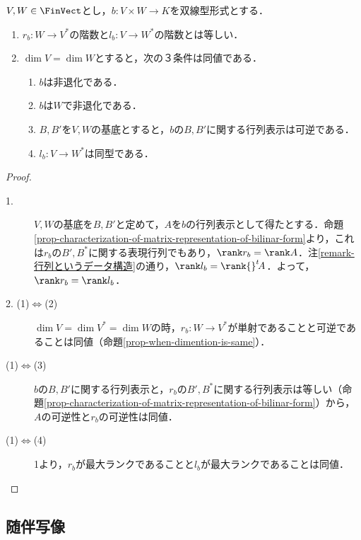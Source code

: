 \documentclass[uplatex, dvipdfmx]{jsreport}
\begin{document}
\begin{proposition}[定義の左右対称性]
    $V,W\in\FinVect$とし，$b:V\times W\to K$を双線型形式とする．
    \begin{enumerate}
        \item $r_b:W\to V^*$の階数と$l_b:V\to W^*$の階数とは等しい．
        \item $\dim V=\dim W$とすると，次の３条件は同値である．
        \begin{enumerate}[(1)]
            \item $b$は非退化である．
            \item $b$は$W$で非退化である．
            \item $B,B'$を$V,W$の基底とすると，$b$の$B,B'$に関する行列表示は可逆である．
            \item $l_b:V\to W^*$は同型である．
        \end{enumerate}
    \end{enumerate}
\end{proposition}
\begin{proof}\mbox{}
    \begin{description}
        \item[1.] $V,W$の基底を$B,B'$と定めて，$A$を$b$の行列表示として得たとする．命題\ref{prop-characterization-of-matrix-representation-of-bilinar-form}より，これは$r_b$の$B',B^*$に関する表現行列でもあり，$\rank r_b=\rank A$．注\ref{remark-行列というデータ構造}の通り，$\rank l_b=\rank {}^t\!A$．よって，$\rank r_b=\rank l_b$．
        \item[2. (1)$\Leftrightarrow$(2)] $\dim V=\dim V^*=\dim W$の時，$r_b:W\to V^*$が単射であることと可逆であることは同値（命題\ref{prop-when-dimention-is-same}）．
        \item[(1)$\Leftrightarrow$(3)] $b$の$B,B'$に関する行列表示と，$r_b$の$B',B^*$に関する行列表示は等しい（命題\ref{prop-characterization-of-matrix-representation-of-bilinar-form}）から，$A$の可逆性と$r_b$の可逆性は同値．
        \item[(1)$\Leftrightarrow$(4)] 1より，$r_b$が最大ランクであることと$l_b$が最大ランクであることは同値．
    \end{description}
\end{proof}

\subsection{随伴写像}
\end{document}

